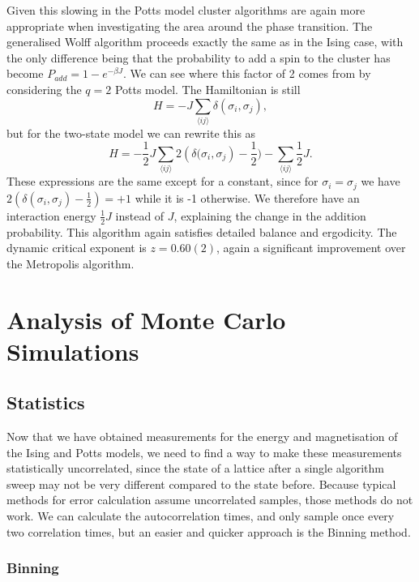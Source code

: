 \documentclass[11pt, a4paper]{report} %
\begin{document}
Given this slowing in the Potts model cluster algorithms are again more appropriate when investigating the area around the phase transition.
The generalised Wolff algorithm proceeds exactly the same as in the Ising case, with the only difference being that the probability to add a spin to the cluster has become \(P_{add} = 1 - e^{-\beta J}\).
We can see where this factor of 2 comes from by considering the \(q=2\) Potts model.
The Hamiltonian is still
\begin{equation}
	H = -J\sum_{\langle i j \rangle} \delta(\sigma_i, \sigma_j),
\end{equation}
but for the two-state model we can rewrite this as
\begin{equation}
	H = -\frac{1}{2} J \sum_{\langle i j \rangle} 2 \left(\delta(\sigma_i, \sigma_j\right) - \frac{1}{2}) - \sum_{\langle i j \rangle} \frac{1}{2}J.
\end{equation}
These expressions are the same except for a constant, since for \(\sigma_i = \sigma_j\) we have \(2 (\delta(\sigma_i, \sigma_j) - \frac{1}{2}) = +1\) while it is -1 otherwise.
We therefore have an interaction energy \(\frac{1}{2}J\) instead of \(J\), explaining the change in the addition probability.
This algorithm again satisfies detailed balance and ergodicity.\cite{newman:1999}
The dynamic critical exponent is \(z=0.60(2)\), again a significant improvement over the Metropolis algorithm.


\chapter{Analysis of Monte Carlo Simulations}
\section{Statistics}
Now that we have obtained measurements for the energy and magnetisation of the Ising and Potts models, we need to find a way to make these measurements statistically uncorrelated, since the state of a lattice after a single algorithm sweep may not be very different compared to the state before.
Because typical methods for error calculation assume uncorrelated samples, those methods do not work.
We can calculate the autocorrelation times, and only sample once every two correlation times, but an easier and quicker approach is the Binning method.

\subsection{Binning}
\end{document}
